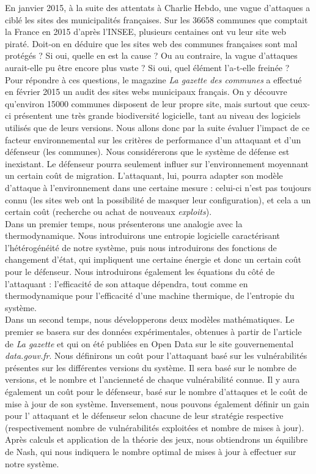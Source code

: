 En janvier 2015, à la suite des attentats à Charlie Hebdo, une vague d'attaques a ciblé les sites des municipalités françaises\cite{courrier}.
Sur les 36658 communes que comptait la France en 2015 d'après l'INSEE\cite{communes_INSEE}, plusieurs centaines ont vu leur site web piraté.
Doit-on en déduire que les sites web des communes françaises sont mal protégés ? Si oui, quelle en est la cause ?
Ou au contraire, la vague d'attaques aurait-elle pu être encore plus vaste ? Si oui, quel élément l'a-t-elle freinée ?\\
Pour répondre à ces questions, le magazine \textit{La gazette des communes} a effectué en février 2015 un audit des sites webs municipaux français\cite{gazette}. On y découvre qu'environ 15000 communes disposent de leur propre site, mais surtout que ceux-ci présentent une très grande biodiversité logicielle, tant au niveau des logiciels utilisés que de leurs versions.
Nous allons donc par la suite évaluer l'impact de ce facteur environnemental sur les critères de performance d'un attaquant et d'un défenseur (les communes). Nous considérerons que le système de défense est inexistant. Le défenseur pourra seulement influer sur l'environnement moyennant un certain coût de migration. L'attaquant, lui, pourra adapter son modèle d'attaque à l'environnement dans une certaine mesure : celui-ci n'est pas toujours connu (les sites web ont la possibilité de masquer leur configuration), et cela a un certain coût (recherche ou achat de nouveaux \textit{exploits}).\\
Dans un premier temps, nous présenterons une analogie avec la thermodynamique. Nous introduirons une entropie logicielle caractérisant l’hétérogénéité de notre système, puis nous introduirons des fonctions de changement d'état, qui impliquent une certaine énergie et donc un certain coût pour le défenseur. Nous introduirons également les équations du côté de l'attaquant : l'efficacité de son attaque dépendra, tout comme en thermodynamique pour l'efficacité d'une machine thermique, de l'entropie du système.\\
Dans un second temps, nous développerons deux modèles mathématiques. Le premier se basera sur des données expérimentales, obtenues à partir de l'article de \textit{La gazette} et qui on été publiées en Open Data sur le site gouvernemental \textit{data.gouv.fr}\cite{data.gouv}. Nous définirons un coût pour l'attaquant basé sur les vulnérabilités présentes sur les différentes versions du système. Il sera basé sur le nombre de versions, et le nombre et l'ancienneté de chaque vulnérabilité connue. Il y aura également un coût pour le défenseur, basé sur le nombre d'attaques et le coût de mise à jour de son système. Inversement, nous pouvons également définir un gain pour l' attaquant et le défenseur selon chacune de leur stratégie respective (respectivement nombre de vulnérabilités exploitées et nombre de mises à jour). Après calculs et application de la théorie des jeux, nous obtiendrons un équilibre de Nash, qui nous indiquera le nombre optimal de mises à jour à effectuer sur notre système.\\

